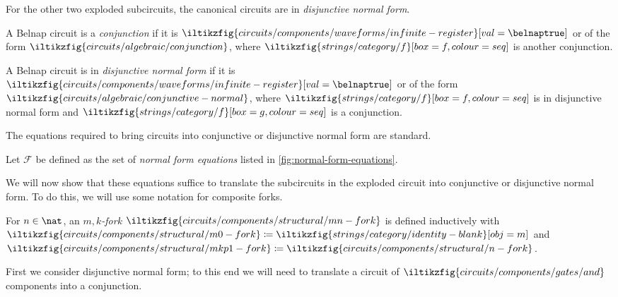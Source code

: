 For the other two exploded subcircuits, the canonical circuits are in
\emph{disjunctive normal form}.

\begin{definition}[Conjunction]
    A Belnap circuit is a \emph{conjunction} if it is \(
    \iltikzfig{circuits/components/waveforms/infinite-register}[val=\belnaptrue]
    \) or of the form \(
    \iltikzfig{circuits/algebraic/conjunction}
    \), where \(
    \iltikzfig{strings/category/f}[box=f, colour=seq]
    \) is another conjunction.
\end{definition}

\begin{definition}
    A Belnap circuit is in \emph{disjunctive normal form} if it is \(
    \iltikzfig{circuits/components/waveforms/infinite-register}[val=\belnaptrue]
    \) or of the form \(
    \iltikzfig{circuits/algebraic/conjunctive-normal}
    \), where \(
    \iltikzfig{strings/category/f}[box=f, colour=seq]
    \) is in disjunctive normal form and \(
    \iltikzfig{strings/category/f}[box=g, colour=seq]
    \) is a conjunction.
\end{definition}

The equations required to bring circuits into conjunctive or disjunctive normal
form are standard.

\begin{definition}
    Let \(\mathcal{F}\) be defined as the set of \emph{normal form equations}
    listed in \cref{fig:normal-form-equations}.
\end{definition}



We will now show that these equations suffice to translate the subcircuits in
the exploded circuit into conjunctive or disjunctive normal form.
To do this, we will use some notation for composite forks.

\begin{definition}\label{def:mk-fork}
    For \(n \in \nat\), an \emph{\(m,k\)-fork}
    \(\iltikzfig{circuits/components/structural/mn-fork}\)
    is defined
    inductively with \(
    \iltikzfig{circuits/components/structural/m0-fork} \coloneqq
    \iltikzfig{strings/category/identity-blank}[obj=m]
    \) and \(
    \iltikzfig{circuits/components/structural/mkp1-fork} \coloneqq
    \iltikzfig{circuits/components/structural/n-fork}
    \).
\end{definition}

First we consider disjunctive normal form; to this end we will need to translate
a circuit of \(\iltikzfig{circuits/components/gates/and}\) components into a
conjunction.

